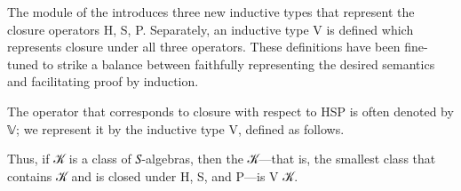 \documentclass[a4paper,UKenglish,cleveref,autoref,thm-restate]{lipics-v2021}
\begin{document}
The \ualibVarietiesVarieties module of the \agdaualib introduces three new inductive types that represent the closure operators \af H, \af S, \af P. Separately, an inductive type \af V is defined which represents closure under all three operators. These definitions have been fine-tuned to strike a balance between faithfully representing the desired semantics and facilitating proof by induction.
\ccpad
\begin{code}%
  
\end{code}
\ccpad
\begin{code}%
  
\end{code}
\ccpad
\begin{code}%
  
\end{code}
\ccpad
The operator that corresponds to closure with respect to \ad H\ad S\ad P is often denoted by 𝕍; we represent it by the inductive type \ad V, defined as follows.
\ccpad
\begin{code}%
  
\end{code}
\ccpad
Thus, if \ab 𝒦 is a class of \ab 𝑆-algebras, then the  \ab 𝒦---that is, the smallest class that contains \ab 𝒦 and is closed under \ad H, \ad S, and \ad P---is \ad V \ab 𝒦.
\end{document}
